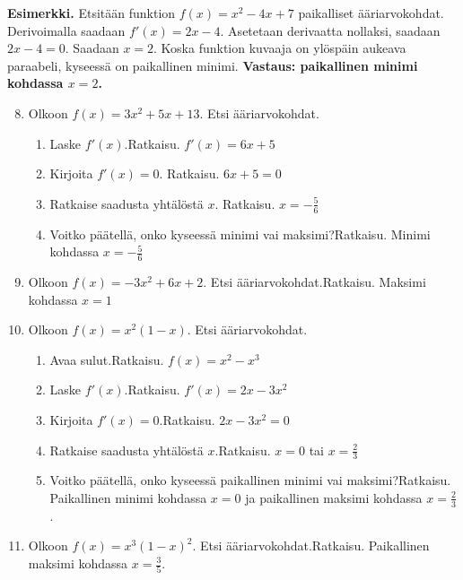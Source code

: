 \documentclass[10pt]{article}
\newcommand{\ratkaisu}[1]{\hfill{\color{blue}\quad\textrm{Ratkaisu. } #1}}
\begin{document}
\textbf{Esimerkki.} Etsitään funktion $f(x)=x^2-4x+7$ paikalliset ääriarvokohdat. Derivoimalla saadaan $f'(x)=2x-4$. Asetetaan derivaatta nollaksi, saadaan $2x-4=0$. Saadaan $x=2$. Koska funktion kuvaaja on ylöspäin aukeava paraabeli, kyseessä on paikallinen minimi. \textbf{Vastaus: paikallinen minimi kohdassa $x=2$.}

\begin{enumerate}
\setcounter{enumi}{7}
\item Olkoon $f(x)=3x^2+5x+13$. Etsi ääriarvokohdat.
\begin{enumerate}
\item Laske $f'(x)$.\ratkaisu{$f'(x)=6x+5$}
\item Kirjoita $f'(x)=0$. \ratkaisu{$6x+5=0$}
\item Ratkaise saadusta yhtälöstä $x$. \ratkaisu{$x=-\frac56$}
\item Voitko päätellä, onko kyseessä minimi vai maksimi?\ratkaisu{Minimi kohdassa $x=-\frac56$}
\end{enumerate}
\item Olkoon $f(x)=-3x^2+6x+2$. Etsi ääriarvokohdat.\ratkaisu{Maksimi kohdassa $x=1$}
\item Olkoon $f(x)=x^2(1-x)$. Etsi ääriarvokohdat.
\begin{enumerate}
\item Avaa sulut.\ratkaisu{$f(x)=x^2-x^3$}
\item Laske $f'(x)$.\ratkaisu{$f'(x)=2x-3x^2$}
\item Kirjoita $f'(x)=0$.\ratkaisu{$2x-3x^2=0$}
\item Ratkaise saadusta yhtälöstä $x$.\ratkaisu{$x=0$ tai $x=\frac23$}
\item Voitko päätellä, onko kyseessä paikallinen minimi vai maksimi?\ratkaisu{Paikallinen minimi kohdassa $x=0$ ja paikallinen maksimi kohdassa $x=\frac23$.}
\end{enumerate}
\item Olkoon $f(x)=x^3(1-x)^2$. Etsi ääriarvokohdat.\ratkaisu{Paikallinen maksimi kohdassa $x=\frac{3}{5}$.}
\end{enumerate}
\end{document}

